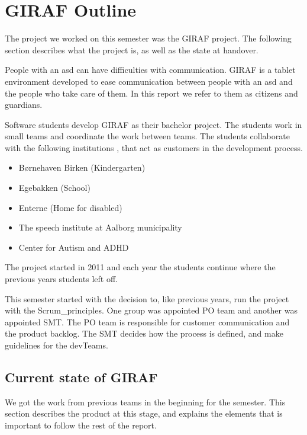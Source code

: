 \chapter{GIRAF Outline}

The project we worked on this semester was the GIRAF project. The following section describes what the project is, as well as the state at handover.

People with an \gls{asd} can have difficulties with communication. GIRAF is a tablet environment developed to ease communication between people with an \gls{asd} and the people who take care of them. In this report we refer to them as \glspl{citizen} and \glspl{guardian}.

Software students develop GIRAF as their bachelor project. The students work in small teams and coordinate the work between teams. The students collaborate with the following institutions \cite{GirafWebsite}, that act as customers in the development process.

\begin{itemize}
    \item Børnehaven Birken (Kindergarten) \cite{bhBirken}
    \item Egebakken (School) \cite{egebakken}
    \item Enterne (Home for disabled) \cite{enterne}
    \item The speech institute at Aalborg municipality
    \item Center for Autism and ADHD \cite{center_for_autism}
\end{itemize}

The project started in 2011 and each year the students continue where the previous years students left off.

This semester started with the decision to, like previous years, run the project with the \gls{Scrum_principles}. One group was appointed \gls{PO} team and another was appointed \gls{SMT}. The \gls{PO} team is responsible for customer communication and the product backlog. The \gls{SMT} decides how the process is defined, and make guidelines for the \glspl{devTeam}.

\section{Current state of GIRAF}

We got the work from previous teams in the beginning for the semester. This section describes the product at this stage, and explains the elements that is important to follow the rest of the report.

